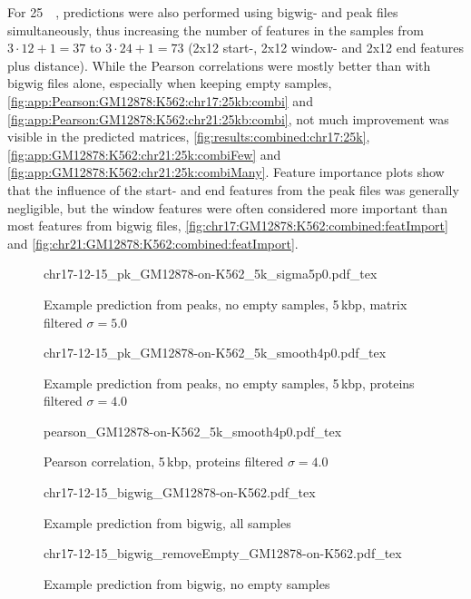 For \SI{25}{\kilo\bp}, predictions were also performed using bigwig- and peak files simultaneously,
thus increasing the number of features in the samples from $3\cdot12+1=37$ to $3\cdot24+1=73$ (2x12 start-, 2x12 window- and 2x12 end features plus 
distance).
While the Pearson correlations were mostly better than with bigwig files alone, especially when keeping empty 
samples, \autoref{fig:app:Pearson:GM12878:K562:chr17:25kb:combi} and \ref{fig:app:Pearson:GM12878:K562:chr21:25kb:combi},
not much improvement was visible in the predicted matrices, \autoref{fig:results:combined:chr17:25k}, \ref{fig:app:GM12878:K562:chr21:25k:combiFew} and 
\ref{fig:app:GM12878:K562:chr21:25k:combiMany}.
Feature importance plots show that the influence of the start- and end features from the peak files was generally negligible, 
but the window features were often considered more important than most features from 
bigwig files, \autoref{fig:chr17:GM12878:K562:combined:featImport} and \ref{fig:chr21:GM12878:K562:combined:featImport}.
\begin{figure}[hp]
 \centering
 \scriptsize
 {chr17-12-15_pk_GM12878-on-K562_5k_sigma5p0.pdf_tex}
 \caption{Example prediction from peaks, no empty samples, 5\,kbp, matrix filtered $\sigma=5.0$}
 \label{fig:results:pk:smoothened:5k}
\end{figure}
\begin{figure}[hp]
 \centering
 \scriptsize
 {chr17-12-15_pk_GM12878-on-K562_5k_smooth4p0.pdf_tex}
 \caption{Example prediction from peaks, no empty samples, 5\,kbp, proteins filtered $\sigma=4.0$}
 \label{fig:results:pk:sigma4p0:5k}
\end{figure}
\begin{figure}[hp]
 \centering
 \scriptsize
 {pearson_GM12878-on-K562_5k_smooth4p0.pdf_tex}
 \caption{Pearson correlation, 5\,kbp, proteins filtered $\sigma=4.0$}
 \label{fig:results:pk:Pearson:sigma4p0:5k}
\end{figure}
\begin{figure}[hp]
 \centering
 \scriptsize
 {chr17-12-15_bigwig_GM12878-on-K562.pdf_tex}
 \caption{Example prediction from bigwig, all samples}
 \label{fig:results:bigwig:allsamples}
\end{figure}
\begin{figure}[hp]
 \centering
 \scriptsize
 {chr17-12-15_bigwig_removeEmpty_GM12878-on-K562.pdf_tex}
 \caption{Example prediction from bigwig, no empty samples}
 \label{fig:results:bigwig:noemptysamples}
\end{figure}

